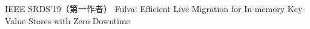 \cvpub
{IEEE SRDS'19（第一作者）} %
{Fulva: Efficient Live Migration for In-memory Key-Value Stores with Zero Downtime} %
{} %
{} %
{ %
}
